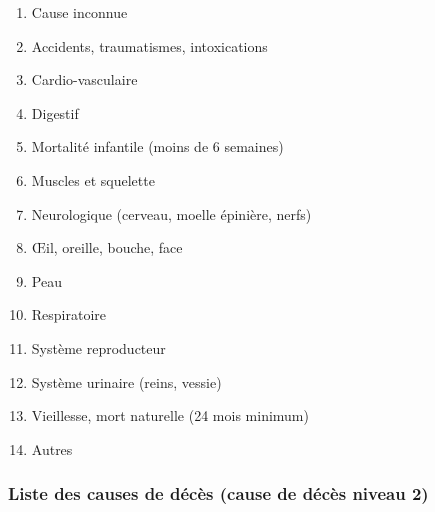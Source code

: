 \documentclass[a4paper,10pt]{article}
\begin{document}
\begin{enumerate}
\item Cause inconnue
\item Accidents, traumatismes, intoxications
\item Cardio-vasculaire
\item Digestif
\item Mortalité infantile (moins de 6 semaines)
\item Muscles et squelette
\item Neurologique (cerveau, moelle épinière, nerfs)
\item Œil, oreille, bouche, face
\item Peau
\item Respiratoire
\item Système reproducteur
\item Système urinaire (reins, vessie)
\item Vieillesse, mort naturelle (24 mois minimum)
\item Autres
\end{enumerate}

\subsubsection{Liste des causes de décès (cause de décès niveau 2)}
\end{document}
